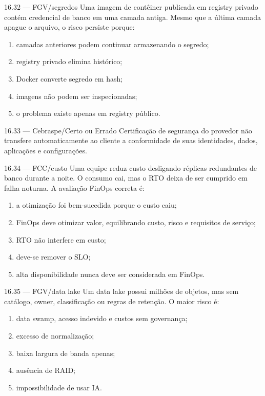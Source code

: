 \begin{questao}{ 16.32 — FGV/segredos}
Uma imagem de contêiner publicada em registry privado contém credencial de banco em uma camada antiga. Mesmo que a última camada apague o arquivo, o risco persiste porque:
\begin{enumerate}[label=\Alph*)]
\item camadas anteriores podem continuar armazenando o segredo;
\item registry privado elimina histórico;
\item Docker converte segredo em hash;
\item imagens não podem ser inspecionadas;
\item o problema existe apenas em registry público.
\end{enumerate}
\end{questao}

\begin{questao}{ 16.33 — Cebraspe/Certo ou Errado}
Certificação de segurança do provedor não transfere automaticamente ao cliente a conformidade de suas identidades, dados, aplicações e configurações.
\end{questao}

\begin{questao}{ 16.34 — FCC/custo}
Uma equipe reduz custo desligando réplicas redundantes de banco durante a noite. O consumo cai, mas o RTO deixa de ser cumprido em falha noturna. A avaliação FinOps correta é:
\begin{enumerate}[label=\Alph*)]
\item a otimização foi bem-sucedida porque o custo caiu;
\item FinOps deve otimizar valor, equilibrando custo, risco e requisitos de serviço;
\item RTO não interfere em custo;
\item deve-se remover o SLO;
\item alta disponibilidade nunca deve ser considerada em FinOps.
\end{enumerate}
\end{questao}

\begin{questao}{ 16.35 — FGV/data lake}
Um data lake possui milhões de objetos, mas sem catálogo, owner, classificação ou regras de retenção. O maior risco é:
\begin{enumerate}[label=\Alph*)]
\item data swamp, acesso indevido e custos sem governança;
\item excesso de normalização;
\item baixa largura de banda apenas;
\item ausência de RAID;
\item impossibilidade de usar IA.
\end{enumerate}
\end{questao}


